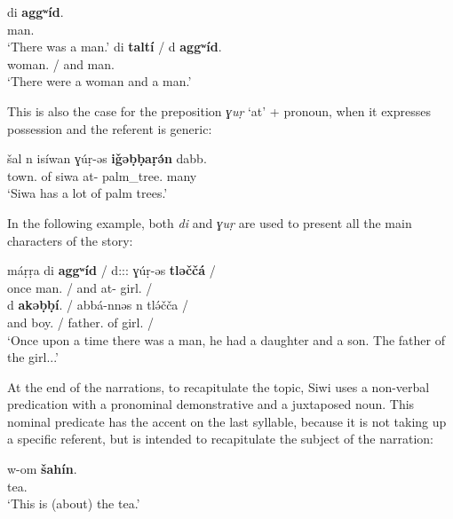 \documentclass[output=paper]{langsci/langscibook}
\begin{document}
\begin{exe}
\ex\label{5ex:6}
\gll	di			{\bf{aggʷíd}}. \\
	{}		man.{} \\
\glt	`There was a man.'
\ex\label{5ex:7}
\gll	di			{\bf{taltí}}		/	d	{\bf{aggʷíd}}. \\
	{}	woman.{}	/	and	man.{} \\
\glt	`There were a woman and a man.'
\end{exe}

This is also the case for the preposition {\emph{ɣuṛ}} `at' + pronoun, when it expresses possession and the referent is generic:

\begin{exe}
\ex\label{5ex:8}
\gll	šal n isíwan ɣúṛ-əs {\bf{iǧəḅḅaṛə́n}} dabb. \\
	town.{} of siwa at-{} palm\_tree.{} many \\
\glt	`Siwa has a lot of palm trees.'
\end{exe}

In the following example, both {\emph{di}} and {\emph{ɣuṛ}} are used to present all the main characters of the story:

\begin{exe}
\ex\label{5ex:9}
\gll	máṛṛa di {\bf{aggʷíd}} / d::: ɣúṛ-əs {\bf{tləččá}} / \\
	once	{} man.{} /	and at-{} girl.{} / \\
\glt
\exi{}
\gll	d {\bf{akəḅḅí}}. / abbá-nnəs n tlə́čča / \\
	and boy.{} / father.{} of girl.{} / \\
\glt	`Once upon a time there was a man, he had a daughter and a son. The father of the girl...'
\end{exe}

At the end of the narrations, to recapitulate the topic, Siwi uses a non-verbal predication with a pronominal demonstrative and a juxtaposed noun. This nominal predicate has the accent on the last syllable, because it is not taking up a specific referent, but is intended to recapitulate the subject of the narration:

\begin{exe}
\ex\label{5ex:10}
\gll	w-om			{\bf{šahín}}. \\
	{}	tea.{} \\
\glt	`This is (about) the tea.'
\end{exe}
\end{document}
